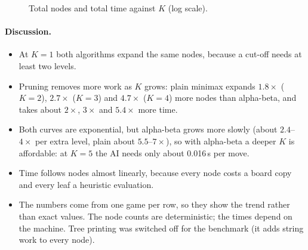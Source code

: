 \documentclass[11pt,a4paper]{article}
\begin{document}
\begin{figure}[H]
\centering
{}
\hfill
{}
\caption{Total nodes and total time against $K$ (log scale).}
\label{fig:bench}
\end{figure}

\paragraph{Discussion.}
\begin{itemize}
  \item At $K=1$ both algorithms expand the same nodes, because a cut-off needs at least
  two levels.
  \item Pruning removes more work as $K$ grows: plain minimax expands $1.8\times$ ($K=2$),
  $2.7\times$ ($K=3$) and $4.7\times$ ($K=4$) more nodes than alpha-beta, and takes about
  $2\times$, $3\times$ and $5.4\times$ more time.
  \item Both curves are exponential, but alpha-beta grows more slowly (about
  $2.4$--$4\times$ per extra level, plain about $5.5$--$7\times$), so with alpha-beta a
  deeper $K$ is affordable: at $K=5$ the AI needs only about 0.016\,s per move.
  \item Time follows nodes almost linearly, because every node costs a board copy and
  every leaf a heuristic evaluation.
  \item The numbers come from one game per row, so they show the trend rather than exact
  values. The node counts are deterministic; the times depend on the machine. Tree
  printing was switched off for the benchmark (it adds string work to every node).
\end{itemize}
\end{document}
